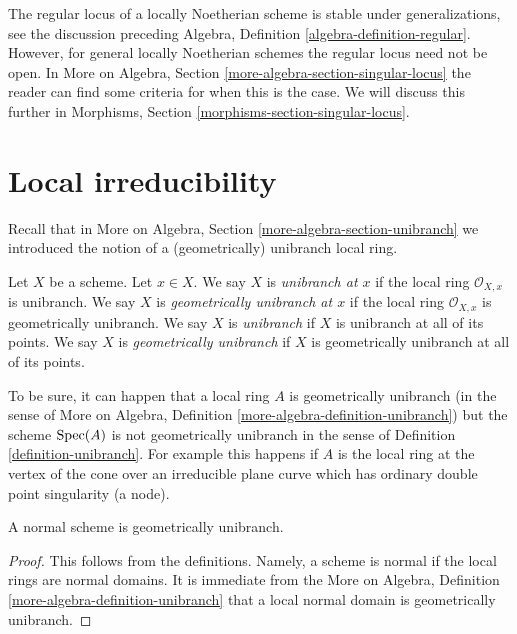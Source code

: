 \noindent
The regular locus of a locally Noetherian scheme is stable under
generalizations, see the discussion preceding
Algebra, Definition \ref{algebra-definition-regular}.
However, for general locally Noetherian schemes the regular locus
need not be open. In
More on Algebra, Section \ref{more-algebra-section-singular-locus}
the reader can find some criteria for when this is the case.
We will discuss this further in
Morphisms, Section \ref{morphisms-section-singular-locus}.






\section{Local irreducibility}
\label{section-unibranch}

\noindent
Recall that in More on Algebra, Section \ref{more-algebra-section-unibranch}
we introduced the notion of a (geometrically) unibranch local ring.

\begin{definition}
\label{definition-unibranch}
\begin{reference}
\cite[Chapter IV (6.15.1)]{EGA4}
\end{reference}
Let $X$ be a scheme. Let $x \in X$. We say $X$ is {\it unibranch at $x$}
if the local ring $\mathcal{O}_{X, x}$ is unibranch. We say $X$ is
{\it geometrically unibranch at $x$}
if the local ring $\mathcal{O}_{X, x}$ is geometrically unibranch.
We say $X$ is {\it unibranch} if $X$ is unibranch at all of its points.
We say $X$ is {\it geometrically unibranch} if $X$ is
geometrically unibranch at all of its points.
\end{definition}

\noindent
To be sure, it can happen that a local ring $A$ is geometrically unibranch
(in the sense of
More on Algebra, Definition \ref{more-algebra-definition-unibranch})
but the scheme $\mathop{\mathrm{Spec}}(A)$ is not geometrically unibranch in the sense
of Definition \ref{definition-unibranch}. For example this happens
if $A$ is the local ring at the vertex of the cone over an irreducible
plane curve which has ordinary double point singularity (a node).

\begin{lemma}
\label{lemma-normal-geometrically-unibranch}
A normal scheme is geometrically unibranch.
\end{lemma}

\begin{proof}
This follows from the definitions. Namely, a scheme
is normal if the local rings are normal domains. It is immediate
from the More on Algebra, Definition \ref{more-algebra-definition-unibranch}
that a local normal domain is geometrically unibranch.
\end{proof}

